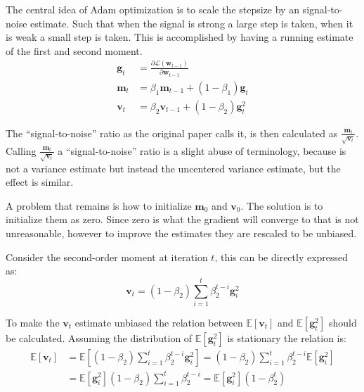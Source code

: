 The central idea of Adam optimization is to scale the stepsize by an signal-to-noise estimate. Such that when the signal is strong a large step is taken, when it is weak a small step is taken. This is accomplished by having a running estimate of the first and second moment.
\begin{equation}
\begin{aligned}
\mathbf{g}_t &= \frac{\partial \mathcal{L}(\mathbf{w}_{t-1})}{\partial \mathbf{w}_{t-1}} \\
\mathbf{m}_t &= \beta_1 \mathbf{m}_{t-1} + (1 - \beta_1) \mathbf{g}_t \\
\mathbf{v}_t &= \beta_2 \mathbf{v}_{t-1} + (1 - \beta_2) \mathbf{g}_t^2
\end{aligned}
\end{equation}

The ``signal-to-noise'' ratio as the original paper \cite{adam-optimization} calls it, is then calculated as $\frac{\mathbf{m}_t}{\sqrt{\mathbf{v}_t}}$. Calling  $\frac{\mathbf{m}_t}{\sqrt{\mathbf{v}_t}}$ a ``signal-to-noise'' ratio is a slight abuse of terminology, because is not a variance estimate but instead the uncentered variance estimate, but the effect is similar.

A problem that remains is how to initialize $\mathbf{m}_{0}$ and $\mathbf{v}_{0}$. The solution is to initialize them as zero. Since zero is what the gradient will converge to that is not unreasonable, however to improve the estimates they are rescaled to be unbiased.

Consider the second-order moment at iteration $t$, this can be directly expressed as:
\begin{equation}
\mathbf{v}_t = (1 - \beta_2)\sum_{i=1}^t \beta_2^{t-i} \mathbf{g}_{i}^2
\end{equation}

To make the $\mathbf{v}_t$ estimate unbiased the relation between $\mathbb{E}[\mathbf{v}_t]$ and $\mathbb{E}[\mathbf{g}_t^2]$ should be calculated. Assuming the distribution of $\mathbb{E}[\mathbf{g}_t^2]$ is stationary the relation is: 
\begin{equation}
\begin{aligned}
\mathbb{E}[\mathbf{v}_t] &= \mathbb{E}\left[(1 - \beta_2)\sum_{i=1}^t \beta_2^{t-i} \mathbf{g}_{i}^2\right]
= (1 - \beta_2)\sum_{i=1}^t \beta_2^{t-i} \mathbb{E}\left[\mathbf{g}_{i}^2\right] \\
&= \mathbb{E}\left[\mathbf{g}_{i}^2\right] (1 - \beta_2)\sum_{i=1}^t \beta_2^{t-i}
= \mathbb{E}\left[\mathbf{g}_{i}^2\right] (1 - \beta_2^t)
\end{aligned}
\end{equation}

